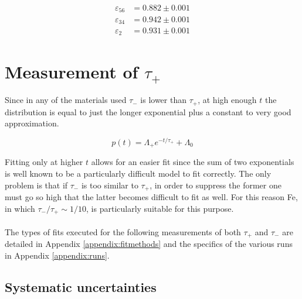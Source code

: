 \documentclass[10pt,a4paper,twocolumn]{article}
\begin{document}
\begin{equation} \label{eff_meas}
\begin{split}
\varepsilon_{56} &=0.882 \pm 0.001 \\
\varepsilon_{34} &=0.942 \pm 0.001 \\
\varepsilon_2 & =0.931\pm 0.001
\end{split}
\end{equation}




\section{Measurement of $\tau_+$}

Since in any of the materials used $\tau_-$ is lower than $\tau_+$, at high enough $t$ the distribution is equal to just the longer exponential plus a constant to very good approximation.

\begin{equation}
    \label{expo_long}
    p(t)=\Lambda_+ e^{-t/\tau_+}+\Lambda_0
\end{equation}


Fitting only at higher $t$ allows for an easier fit since the sum of two exponentials is well known to be a particularly difficult model to fit correctly. The only problem is that if $\tau_-$ is too similar to $\tau_+$, in order to suppress the former one must go so high that the latter becomes difficult to fit as well. For this reason Fe, in which $\tau_-/\tau_+\sim 1/10$, is particularly suitable for this purpose.
\\
\\
The types of fits executed for the following measurements of both $\tau_+$ and $\tau_-$ are detailed in Appendix \ref{appendix:fitmethods} and the specifics of the various runs in Appendix \ref{appendix:runs}.

\subsection{Systematic uncertainties}
\end{document}
